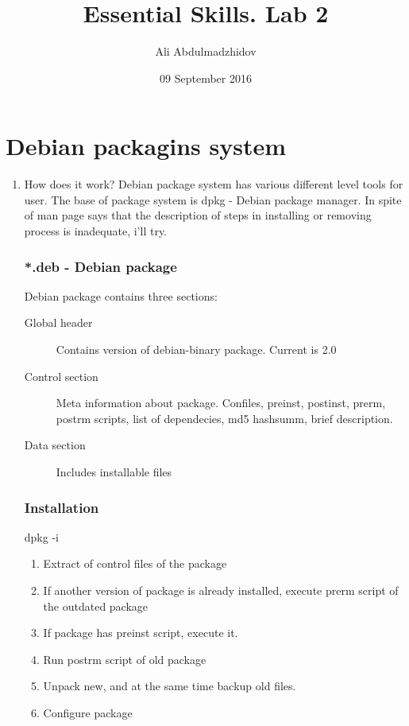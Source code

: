 \documentclass[10pt]{article}
\title{Essential Skills. Lab 2}
\date{09 September 2016}
\author{Ali Abdulmadzhidov}
\begin{document}
\renewcommand*\rmdefault{cmss}
  \maketitle
  \section{Debian packagins system    \newline}

  \begin{enumerate}
    \item How does it work?
        Debian package system has various different level tools for user. The base of package system is dpkg - Debian package manager. In spite of man page says that the description of steps in installing or removing process is inadequate, i'll try.
        
        \subsubsection*{*.deb - Debian package}
            Debian package contains three sections:
                \begin{description}
                    \item[Global header] Contains version of debian-binary package. Current is 2.0
                    \item[Control section] Meta information about package. Confiles, preinst, postinst, prerm, postrm scripts, list of dependecies, md5 hashsumm, brief description. 
                    \item[Data section] Includes installable files
                \end{description}
        \subsubsection*{Installation}
        dpkg -i
        \begin{enumerate}[label=\arabic*,ref=\theenumi]
            \item Extract of control files of the package
            \item If another version of package is already installed, execute prerm script of the outdated package
            \item If package has preinst script, execute it.
            \item Run postrm script of old package
            \item Unpack new, and at the same time backup old files.
            \item Configure package
        \end{enumerate}


\end{enumerate}
\end{document}
